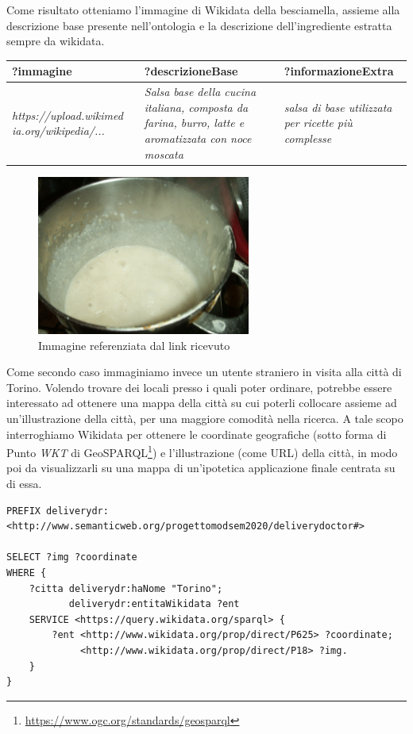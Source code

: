 \documentclass[12pt]{article}
\begin{document}
Come risultato otteniamo l'immagine di Wikidata della besciamella, assieme alla descrizione base presente nell'ontologia e la descrizione dell'ingrediente estratta sempre da wikidata.
\newline
\newline
\begin{tabularx}{\textwidth} { 
  | >{\centering\arraybackslash}X
  | >{\centering\arraybackslash}X
  | >{\centering\arraybackslash}X |}
 \hline
 \textbf{?immagine} & \textbf{?descrizioneBase} & \textbf{?informazioneExtra} \\
 \hline
 \textit{https://upload.wikimed} \textit{ia.org/wikipedia/...} & \textit{Salsa base della cucina italiana, composta da farina, burro, latte e aromatizzata con noce moscata} & \textit{salsa di base utilizzata per ricette più complesse} \\
\hline
\end{tabularx}
\newline
\begin{figure}[H]
    \centering
         \includegraphics[width=7cm]{files/Lasagne_al_forno_salsa_besciamella.jpg}
    \caption{Immagine referenziata dal link ricevuto}
\end{figure}
Come secondo caso immaginiamo invece un utente straniero in visita alla città di Torino.\newline
Volendo trovare dei locali presso i quali poter ordinare, potrebbe essere interessato ad ottenere una mappa della città su cui poterli collocare assieme ad un'illustrazione della città, per una maggiore comodità nella ricerca.\newline
A tale scopo interroghiamo Wikidata per ottenere le coordinate geografiche (sotto forma di Punto \textit{WKT} di GeoSPARQL\footnote{\url{https://www.ogc.org/standards/geosparql}}) e l'illustrazione (come URL) della città, in modo poi da visualizzarli su una mappa di un'ipotetica applicazione finale centrata su di essa.
\newpage
\begin{lstlisting}[language=SPARQL]
PREFIX deliverydr: 
<http://www.semanticweb.org/progettomodsem2020/deliverydoctor#>

SELECT ?img ?coordinate
WHERE {
    ?citta deliverydr:haNome "Torino";
           deliverydr:entitaWikidata ?ent
    SERVICE <https://query.wikidata.org/sparql> {
        ?ent <http://www.wikidata.org/prop/direct/P625> ?coordinate;
             <http://www.wikidata.org/prop/direct/P18> ?img.
    }
}
\end{lstlisting}
\end{document}
